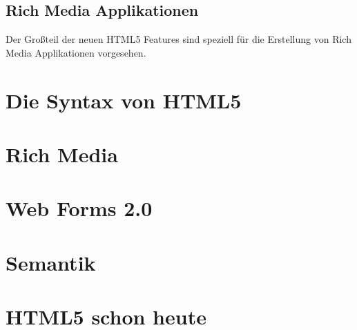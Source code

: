 \subsection{Rich Media Applikationen}
Der Großteil der neuen HTML5 Features sind speziell für die Erstellung von Rich
Media Applikationen vorgesehen.

\section{Die Syntax von HTML5}

\section{Rich Media}

\section{Web Forms 2.0}

\section{Semantik}

\section{HTML5 schon heute}
